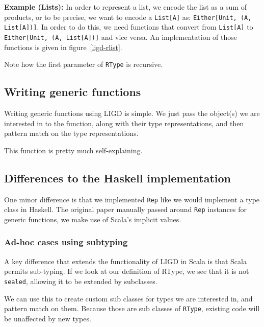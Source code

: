 \documentclass[abstracton,parskip=half]{scrreprt}
\newcommand{\cd}{\texttt}
\begin{document}
    \textbf{Example (Lists):} In order to represent a list, we encode the
    list as a sum of products, or to be precise, we want to encode a \cd{List[A]}
    as: \cd{Either[Unit, (A, List[A])]}. In order to do this, we need functions
    that convert from \cd{List[A]} to \cd{Either[Unit, (A, List[A])]} and
    vice versa. An implementation of those functions is given in figure~\ref{ligd-rlist}.

    

    Note how the first parameter of \cd{RType} is recursive.

    \subsection{Writing generic functions}
    Writing generic functions using LIGD is simple. We just pass the object(s)
    we are interested in to the function, along with their type representations,
    and then pattern match on the type representations.

      

    This function is pretty much self-explaining.

    \subsection{Differences to the Haskell implementation}
    One minor difference is that we implemented \cd{Rep} like we would implement
    a type class in Haskell. The original paper manually passed around \cd{Rep}
    instances for generic functions, we make use of Scala's implicit values.


    \subsubsection{Ad-hoc cases using subtyping}
    A key difference that extends the functionality of LIGD in Scala is that
    Scala permits sub-typing. If we look at our definition of RType, we see
    that it is not \cd{sealed}, allowing it to be extended by subclasses.

    We can use this to create custom sub classes for types we are interested
    in, and pattern match on them. Because those are sub classes of \cd{RType},
    existing code will be unaffected by new types.
\end{document}
